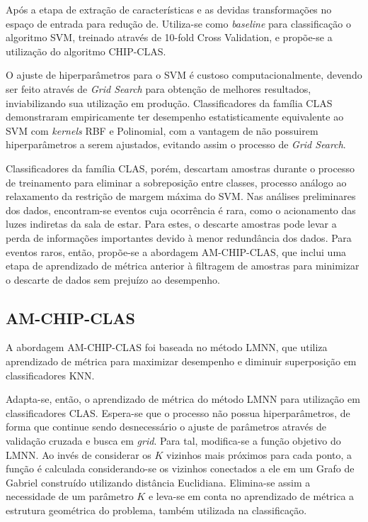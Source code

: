 \documentclass[
	12pt,				%
	openright,			%
	twoside,			%
	a4paper,			%
	english,			%
	spanish,			%
	brazil,				%
	]{abntex2}\usepackage[]{graphicx}\usepackage[]{color}
\begin{document}
Após a etapa de extração de características e as devidas transformações no espaço de entrada para redução de. Utiliza-se como \textit{baseline} para classificação o algoritmo SVM, treinado através de 10-fold Cross Validation, e propõe-se a utilização do algoritmo CHIP-CLAS.

O ajuste de hiperparâmetros para o SVM é custoso computacionalmente, devendo ser feito através de \textit{Grid Search} para obtenção de melhores resultados, inviabilizando sua utilização em produção. Classificadores da família CLAS demonstraram empiricamente ter desempenho estatisticamente equivalente ao SVM com \textit{kernels} RBF e Polinomial, com a vantagem de não possuirem hiperparâmetros a serem ajustados, evitando assim o processo de \textit{Grid Search}.

Classificadores da família CLAS, porém, descartam amostras durante o processo de treinamento para eliminar a sobreposição entre classes, processo análogo ao relaxamento da restrição de margem máxima do SVM. Nas análises preliminares dos dados, encontram-se eventos cuja ocorrência é rara, como o acionamento das luzes indiretas da sala de estar. Para estes, o descarte amostras pode levar a perda de informações importantes devido à menor redundância dos dados. Para eventos raros, então, propõe-se a abordagem AM-CHIP-CLAS, que inclui uma etapa de aprendizado de métrica anterior à filtragem de amostras para minimizar o descarte de dados sem prejuízo ao desempenho.

\subsection{AM-CHIP-CLAS}

A abordagem AM-CHIP-CLAS foi baseada no método LMNN, que utiliza aprendizado de métrica para maximizar desempenho e diminuir superposição em classificadores KNN.

Adapta-se, então, o aprendizado de métrica do método LMNN para utilização em classificadores CLAS. Espera-se que o processo não possua hiperparâmetros, de forma que continue sendo desnecessário o ajuste de parâmetros através de validação cruzada e busca em \textit{grid}. Para tal, modifica-se a função objetivo do LMNN. Ao invés de considerar os $K$ vizinhos mais próximos para cada ponto, a função é calculada considerando-se os vizinhos conectados a ele em um Grafo de Gabriel construído utilizando distância Euclidiana. Elimina-se assim a necessidade de um parâmetro $K$ e leva-se em conta no aprendizado de métrica a estrutura geométrica do problema, também utilizada na classificação.
\end{document}
